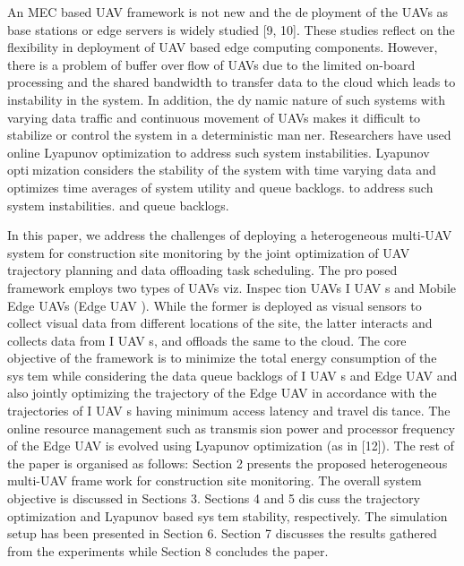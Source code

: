 \documentclass{article}
\begin{document}
\begin{multicols}{2}
An MEC based UAV framework is not new and the deployment of the UAVs as base stations or edge servers
is widely studied [9, 10]. These studies reflect on the flexibility in deployment of UAV based edge computing
components. However, there is a problem of buffer overflow of UAVs due to the limited on-board processing and
the shared bandwidth to transfer data to the cloud which
leads to instability in the system. In addition, the dynamic nature of such systems with varying data traffic
and continuous movement of UAVs makes it difficult to
stabilize or control the system in a deterministic manner. Researchers have used online Lyapunov optimization \cite{neely2010stochastic}to address such system instabilities. Lyapunov optimization considers the stability of the system with time
varying data and optimizes time averages of system utility
and queue backlogs. to address such system instabilities.
and queue backlogs.


In this paper, we address the challenges of deploying
a heterogeneous multi-UAV system for construction site
monitoring by the joint optimization of UAV trajectory
planning and data offloading task scheduling. The proposed framework employs two types of UAVs viz. Inspection UAVs I UAV s and Mobile Edge UAVs (Edge UAV ).
While the former is deployed as visual sensors to collect
visual data from different locations of the site, the latter
interacts and collects data from I UAV s, and offloads the
same to the cloud. The core objective of the framework
is to minimize the total energy consumption of the system while considering the data queue backlogs of I UAV s
and Edge UAV and also jointly optimizing the trajectory
of the Edge UAV in accordance with the trajectories of
I UAV s having minimum access latency and travel distance. The online resource management such as transmission power and processor frequency of the Edge UAV is
evolved using Lyapunov optimization (as in [12]).
The rest of the paper is organised as follows: Section
2 presents the proposed heterogeneous multi-UAV framework for construction site monitoring. The overall system
objective is discussed in Sections 3. Sections 4 and 5 discuss the trajectory optimization and Lyapunov based system stability, respectively. The simulation setup has been presented in Section 6. Section 7 discusses the results
gathered from the experiments while Section 8 concludes
the paper.


\end{multicols}
\end{document}
